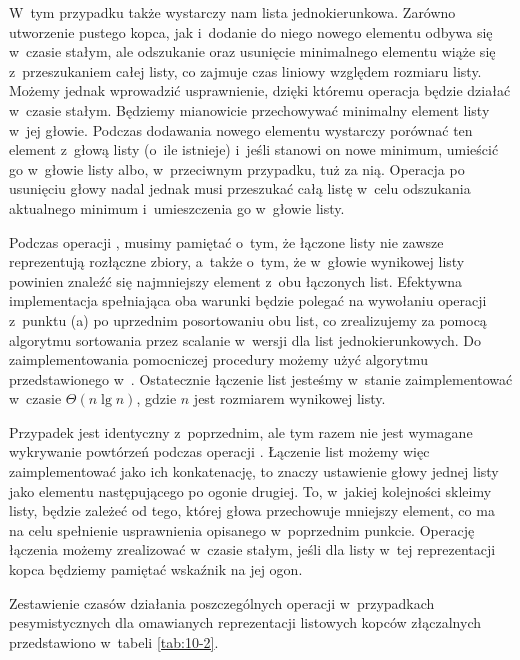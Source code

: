 \subproblem %
W~tym przypadku także wystarczy nam lista jednokierunkowa.
Zarówno utworzenie pustego kopca, jak i~dodanie do niego nowego elementu odbywa się w~czasie stałym, ale odszukanie oraz usunięcie minimalnego elementu wiąże się z~przeszukaniem całej listy, co zajmuje czas liniowy względem rozmiaru listy.
Możemy jednak wprowadzić usprawnienie, dzięki któremu operacja  będzie działać w~czasie stałym.
Będziemy mianowicie przechowywać minimalny element listy w~jej głowie.
Podczas dodawania nowego elementu wystarczy porównać ten element z~głową listy (o~ile istnieje) i~jeśli stanowi on nowe minimum, umieścić go w~głowie listy albo, w~przeciwnym przypadku, tuż za nią.
Operacja  po usunięciu głowy nadal jednak musi przeszukać całą listę w~celu odszukania aktualnego minimum i~umieszczenia go w~głowie listy.

Podczas operacji , musimy pamiętać o~tym, że łączone listy nie zawsze reprezentują rozłączne zbiory, a~także o~tym, że w~głowie wynikowej listy powinien znaleźć się najmniejszy element z~obu łączonych list.
Efektywna implementacja spełniająca oba warunki będzie polegać na wywołaniu operacji  z~punktu (a) po uprzednim posortowaniu obu list, co zrealizujemy za pomocą algorytmu sortowania przez scalanie w~wersji dla list jednokierunkowych.
Do zaimplementowania pomocniczej procedury  możemy użyć algorytmu przedstawionego w~.
Ostatecznie łączenie list jesteśmy w~stanie zaimplementować w~czasie $\Theta(n\lg n)$, gdzie $n$ jest rozmiarem wynikowej listy.

\subproblem %
Przypadek jest identyczny z~poprzednim, ale tym razem nie jest wymagane wykrywanie powtórzeń podczas operacji .
Łączenie list możemy więc zaimplementować jako ich konkatenację, to znaczy ustawienie głowy jednej listy jako elementu następującego po ogonie drugiej.
To, w~jakiej kolejności skleimy listy, będzie zależeć od tego, której głowa przechowuje mniejszy element, co ma na celu spełnienie usprawnienia opisanego w~poprzednim punkcie.
Operację łączenia możemy zrealizować w~czasie stałym, jeśli dla listy w~tej reprezentacji kopca będziemy pamiętać wskaźnik na jej ogon.

\bigskip
\noindent Zestawienie czasów działania poszczególnych operacji w~przypadkach pesymistycznych dla omawianych reprezentacji listowych kopców złączalnych przedstawiono w~tabeli \ref{tab:10-2}.

